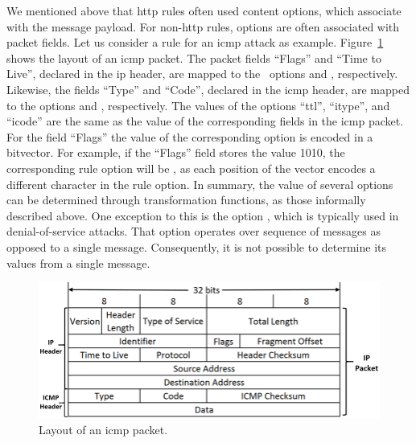 \documentclass[sigconf,review, anonymous]{acmart}
\begin{document}
We mentioned above that http rules often used content options, which
associate with the message payload. For non-http rules, options are
often associated with packet fields. Let us consider a rule for an
icmp attack as example. Figure~\ref{fig:icmp-packet-layout} shows the
layout of an icmp packet. The packet fields ``Flags'' and ``Time to
Live'', declared in the ip header, are mapped to the \suri\ options
 and , respectively. Likewise, the fields
``Type'' and ``Code'', declared in the icmp header, are mapped to the
options  and , respectively. The values of
the options ``ttl'', ``itype'', and ``icode'' are the same as the
value of the corresponding fields in the icmp packet. For the field
``Flags'' the value of the corresponding option is encoded in a
bitvector. For example, if the ``Flags'' field stores the value 1010,
the corresponding rule option will be , as each
position of the vector encodes a different character in the
 rule option. In summary, the value of several
options can be determined through transformation functions, as those
informally described above. One exception to this is the option
, which is typically used in denial-of-service
attacks. That option operates over sequence of messages as opposed to
a single message. Consequently, it is not possible to determine its
values from a single message.

\begin{figure}[t!]
\centering
\includegraphics[scale=0.27]{figs/ICMP-packet-structure.png}
\vspace{-2ex}
\caption{Layout of an icmp packet.}
\vspace{-2ex}
\label{fig:icmp-packet-layout}
\end{figure}

\end{document}
